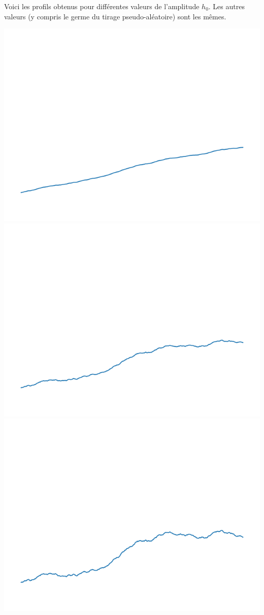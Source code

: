 \documentclass[11pt,class=report,crop=false]{standalone}
\begin{document}
\begin{exemple}
Voici les profils obtenus pour différentes valeurs de l'amplitude $h_0$. 
Les autres valeurs (y compris le germe du tirage pseudo-aléatoire) sont les mêmes.

\begin{center}
\includegraphics[scale=\myscale,scale=0.2]{figures/landscape-05-01}
\includegraphics[scale=\myscale,scale=0.2]{figures/landscape-05-03}
\includegraphics[scale=\myscale,scale=0.2]{figures/landscape-05-05}

\end{center}
\end{exemple}
\end{document}
